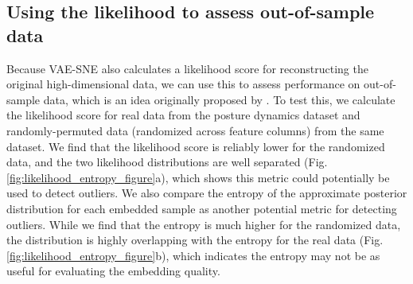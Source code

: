 \subsection{Using the likelihood to assess out-of-sample data}
Because VAE-SNE also calculates a likelihood score for reconstructing the original high-dimensional data, we can use this to assess performance on out-of-sample data, which is an idea originally proposed by \cite{ding2018scvis}. To test this, we calculate the likelihood score for real data from the posture dynamics dataset \citep{berman2014mapping, berman2016predictability, pereira2019fast} and randomly-permuted data (randomized across feature columns) from the same dataset. We find that the likelihood score is reliably lower for the randomized data, and the two likelihood distributions are well separated (Fig. \ref{fig:likelihood_entropy_figure}a), which shows this metric could potentially be used to detect outliers. We also compare the entropy of the approximate posterior distribution for each embedded sample as another potential metric for detecting outliers. While we find that the entropy is much higher for the randomized data, the distribution is highly overlapping with the entropy for the real data (Fig. \ref{fig:likelihood_entropy_figure}b), which indicates the entropy may not be as useful for evaluating the embedding quality.

